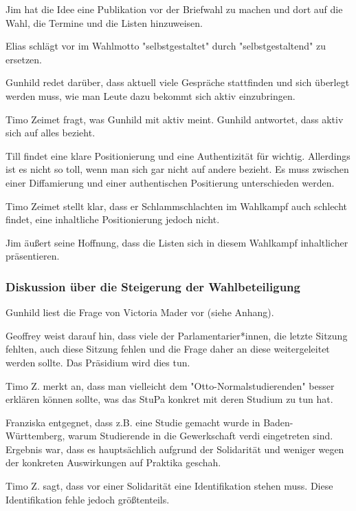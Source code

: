 \documentclass[ngerman,headheight=70pt]{scrartcl}
\begin{document}
    Jim hat die Idee eine Publikation vor der Briefwahl zu machen und dort auf
    die Wahl, die Termine und die Listen hinzuweisen.

    Elias schlägt vor im Wahlmotto "selbstgestaltet" durch "selbstgestaltend"
    zu ersetzen.

    Gunhild redet darüber, dass aktuell viele Gespräche stattfinden und sich überlegt
    werden muss, wie man Leute dazu bekommt sich aktiv einzubringen.

    Timo Zeimet fragt, was Gunhild mit aktiv meint. Gunhild antwortet, dass aktiv
    sich auf alles bezieht.

    Till findet eine klare Positionierung und eine Authentizität für wichtig.
    Allerdings ist es nicht so toll, wenn man sich gar nicht auf andere bezieht.
    Es muss zwischen einer Diffamierung und einer authentischen Positierung
    unterschieden werden.

    Timo Zeimet stellt klar, dass er Schlammschlachten im Wahlkampf auch schlecht
    findet, eine inhaltliche Positionierung jedoch nicht.

    Jim äußert seine Hoffnung, dass die Listen sich in diesem Wahlkampf inhaltlicher
    präsentieren.

    \subsubsection{Diskussion über die Steigerung der Wahlbeteiligung}

    Gunhild liest die Frage von Victoria Mader vor (siehe Anhang).

    Geoffrey weist darauf hin, dass viele der Parlamentarier*innen, die letzte Sitzung
    fehlten, auch diese Sitzung fehlen und die Frage daher an diese weitergeleitet
    werden sollte. Das Präsidium wird dies tun.

    Timo Z. merkt an, dass man vielleicht dem "Otto-Normalstudierenden"
    besser erklären können sollte, was das StuPa konkret mit deren Studium zu tun
    hat.

    Franziska entgegnet, dass z.B. eine Studie gemacht wurde in Baden-Württemberg,
    warum Studierende in die Gewerkschaft verdi eingetreten sind. Ergebnis war, dass
    es hauptsächlich aufgrund der Solidarität und weniger wegen der konkreten
    Auswirkungen auf Praktika geschah.

    Timo Z. sagt, dass vor einer Solidarität eine Identifikation stehen muss.
    Diese Identifikation fehle jedoch größtenteils.
\end{document}
